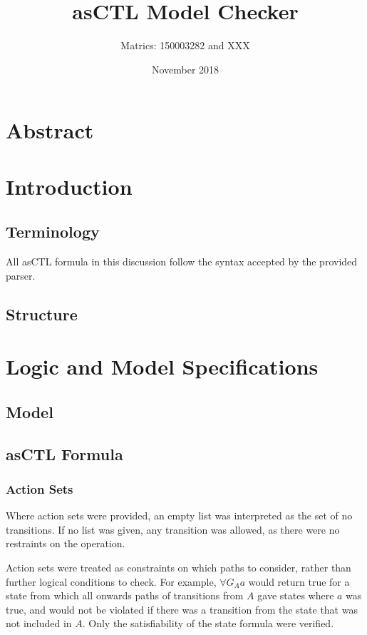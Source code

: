 \documentclass[a4paper,11pt]{article}
\title{asCTL Model Checker}
\author{Matrics: 150003282 and XXX}
\date{November 2018}
\begin{document}
	
	\maketitle
	\section*{Abstract}
	
	\pagebreak
	\section{Introduction}
	\subsection{Terminology}
	All asCTL formula in this discussion follow the syntax accepted by the provided parser.
	
	\subsection{Structure}
	
	
	
	\section{Logic and Model Specifications}
	\subsection{Model}
	\subsection{asCTL Formula}
	\subsubsection{Action Sets}
	Where action sets were provided, an empty list was interpreted as the set of no transitions. If no list was given, any transition was allowed, as there were no restraints on the operation.
	
	Action sets were treated as constraints on which paths to consider, rather than further logical conditions to check. For example, $\forall G{_Aa}$ would return true for a state from which all onwards paths of transitions from $A$ gave states where $a$ was true, and would not be violated if there was a transition from the state that was not included in $A$. Only the satisfiability of the state formula were verified.
	
\end{document}
